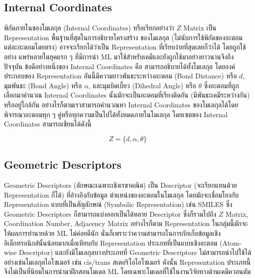 \subsection{Internal Coordinates}
\label{ssec:internal_coord}

พิกัดภายในของโมเลกุล (Internal Coordinates) หรือเรียกอย่างว่า $Z$ Matrix เป็น Representation พื้นฐานที่สุดในการอธิบายโครงสร้าง%
ของโมเลกุล (ไม่นับการใช้พิกัดของอะตอมแต่ละอะตอมโดยตรง) อาจจะเรียกได้ว่าเป็น Representation ที่เรียบง่ายที่สุดเลยก็ว่าได้ โดยถูกใช้อย่าง%
แพร่หลายในยุคแรก ๆ ที่มีการนำ ML มาใช้สำหรับเคมีและยังถูกใช้มาอย่างยาวนานจึงถึงปัจจุบัน ข้อดีอย่างหนึ่งของ Internal Coordinates คือ%
สามารถอธิบายได้ทั้งโมเลกุล โดยองค์ประกอบของ Representation อันนี้มีความยาวพันธะระหว่างอะตอม (Bond Distance) หรือ $d$, มุมพันธะ 
(Bond Angle) หรือ $\alpha$, และมุมบิดเบี้ยว (Dihedral Angle) หรือ $\theta$ ซึ่งอะตอมที่ถูกเลือกมาคำนวณ Internal 
Coordinates นั้นมักจะเป็นอะตอมที่เรียงติดกัน (มีพันธะเคมีระหว่างกัน) หรืออยู่ใกล้กัน อย่างไรก็ตามเราสามารถคำนวณหา Internal 
Coordinates ของโมเลกุลได้โดยพิจารณาอะตอมทุก ๆ คู่หรือทุกความเป็นไปได้ทั้งหมดภายในโมเลกุล โดยเซตของ Internal Coordinates 
สามารถเขียนได้ดังนี้

\begin{equation}\label{eq:internal_coord}
    Z = \{ d, \alpha, \theta \}
\end{equation}

\subsection{Geometric Descriptors}
\label{ssec:geom_descriptor}

Geometric Descriptors (ลักษณะเฉพาะเชิงเรขาคณิต) เป็น Descriptor (จะเรียกแทนด้วย Representation ก็ได้) ที่อ้างอิงกับข้อมูล%
ตำแหน่งของอะตอมในโมเลกุล โดยมักจะเชื่อมโยงกับ Representation แบบที่เป็นสัญลักษณ์ (Symbolic Representation) เช่น SMILES ซึ่ง 
Geometric Descriptors ก็สามารถแบ่งออกเป็นได้หลาย Descriptor ซึ่งก็รวมไปถึง $Z$ Matrix, Coordination Number, Adjacency 
Matrix อย่างไรก็ตาม Representation ในกลุ่มนี้มักจะให้ผลการทำนายด้วย ML ไม่ค่อยดีนัก นั่นก็เพราะว่าความสามารถในการกักเก็บข้อมูลเชิง%
อิเล็กทรอนิกส์นั้นน้อยมากเมื่อเทียบกับ Representation ประเภทที่เป็นแบบเชิงอะตอม (Atom-wise Descriptor) และยังมีโมเลกุลบางประเภทที่ 
Geometric Descriptors ไม่สามารถนำไปใช้ได้ อย่างเช่นโมเลกุลไอโซเมอร์ เช่น cis/trans สเตอริโอไอโซเมอร์ ดังนั้น Representation 
ประเภทนี้จึงไม่เป็นที่นิยมในการนำมาฝึกสอนโมเดล ML โดยเฉพาะโมเดลที่ใช้ในงานวิจัยทางด้านเคมีควอนตัม\autocite{keith2021,musil2021}

